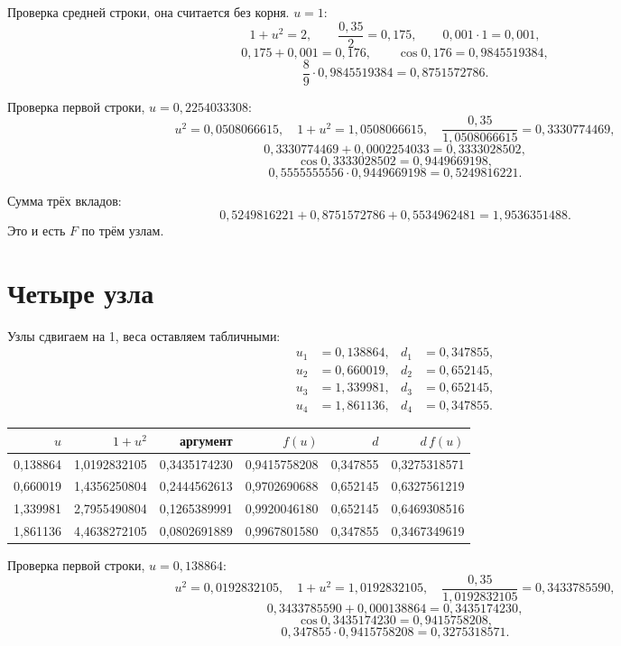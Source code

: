 \documentclass[11pt,a4paper]{article}
\begin{document}
Проверка средней строки, она считается без корня. \(u = 1\):
\[
1 + u^{2} = 2,
\qquad
\frac{0{,}35}{2} = 0{,}175,
\qquad
0{,}001\cdot 1 = 0{,}001,
\]
\[
0{,}175 + 0{,}001 = 0{,}176,
\qquad
\cos 0{,}176 = 0{,}9845519384,
\]
\[
\frac{8}{9}\cdot 0{,}9845519384 = 0{,}8751572786.
\]

Проверка первой строки, \(u = 0{,}2254033308\):
\[
u^{2} = 0{,}0508066615,
\quad
1 + u^{2} = 1{,}0508066615,
\quad
\frac{0{,}35}{1{,}0508066615} = 0{,}3330774469,
\]
\[
0{,}3330774469 + 0{,}0002254033 = 0{,}3333028502,
\]
\[
\cos 0{,}3333028502 = 0{,}9449669198,
\]
\[
0{,}5555555556 \cdot 0{,}9449669198 = 0{,}5249816221.
\]

Сумма трёх вкладов:
\[
0{,}5249816221 + 0{,}8751572786 + 0{,}5534962481 = 1{,}9536351488.
\]
Это и есть \(F\) по трём узлам.

\section*{Четыре узла}

Узлы сдвигаем на 1, веса оставляем табличными:
\[
\begin{aligned}
u_{1} &= 0{,}138864, & d_{1} &= 0{,}347855,\\
u_{2} &= 0{,}660019, & d_{2} &= 0{,}652145,\\
u_{3} &= 1{,}339981, & d_{3} &= 0{,}652145,\\
u_{4} &= 1{,}861136, & d_{4} &= 0{,}347855.
\end{aligned}
\]

{\small
\begin{center}
\begin{tabular}{@{}r r r r r r@{}}
\toprule
\(u\) & \(1+u^{2}\) & аргумент & \(f(u)\) & \(d\) & \(d\,f(u)\) \\
\midrule
0,138864 & 1,0192832105 & 0,3435174230 & 0,9415758208 & 0,347855 & 0,3275318571 \\
0,660019 & 1,4356250804 & 0,2444562613 & 0,9702690688 & 0,652145 & 0,6327561219 \\
1,339981 & 2,7955490804 & 0,1265389991 & 0,9920046180 & 0,652145 & 0,6469308516 \\
1,861136 & 4,4638272105 & 0,0802691889 & 0,9967801580 & 0,347855 & 0,3467349619 \\
\bottomrule
\end{tabular}
\end{center}
}

Проверка первой строки, \(u = 0{,}138864\):
\[
u^{2} = 0{,}0192832105,
\quad
1 + u^{2} = 1{,}0192832105,
\quad
\frac{0{,}35}{1{,}0192832105} = 0{,}3433785590,
\]
\[
0{,}3433785590 + 0{,}000138864 = 0{,}3435174230,
\]
\[
\cos 0{,}3435174230 = 0{,}9415758208,
\]
\[
0{,}347855 \cdot 0{,}9415758208 = 0{,}3275318571.
\]
\end{document}
